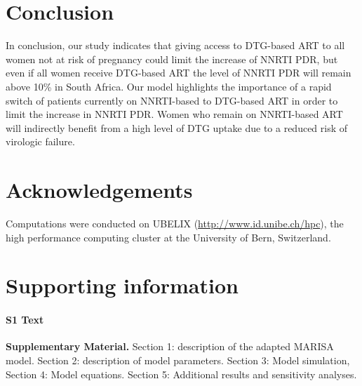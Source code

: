 \documentclass[10pt,letterpaper]{article}
\begin{document}
\section*{Conclusion}
In conclusion, our study indicates that giving access to DTG-based ART to all women not at risk of pregnancy could limit the increase of NNRTI PDR, but even if all women receive DTG-based ART the level of NNRTI PDR will remain above 10\% in South Africa. Our model highlights the importance of a rapid switch of patients currently on NNRTI-based to DTG-based ART in order to limit the increase in NNRTI PDR. Women who remain on NNRTI-based ART will indirectly benefit from a high level of DTG uptake due to a reduced risk of virologic failure. 

\section*{Acknowledgements}
Computations were conducted on UBELIX (\url{http://www.id.unibe.ch/hpc}), the high performance computing cluster at the University of Bern, Switzerland.

\nolinenumbers




\section*{Supporting information}

\paragraph*{S1 Text}
\label{s1_file}
{\bf Supplementary Material.} Section 1: description of the adapted MARISA model. Section 2: description of model parameters. Section 3: Model simulation, Section 4: Model equations. Section 5: Additional results and sensitivity analyses.
\end{document}

